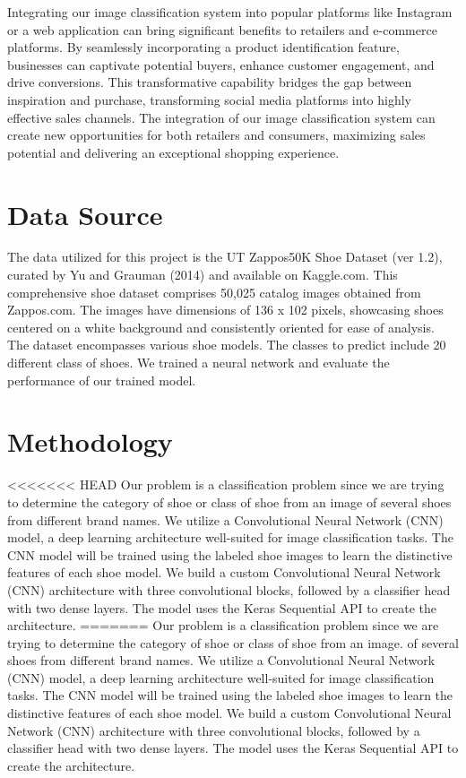 \documentclass[11pt,a4paper]{article}
\begin{document}
\noindent
Integrating our image classification system into popular platforms like Instagram or a web application can bring significant benefits to retailers and e-commerce platforms. By seamlessly incorporating a product identification feature, businesses can captivate potential buyers, enhance customer engagement, and drive conversions. This transformative capability bridges the gap between inspiration and purchase, transforming social media platforms into highly effective sales channels. The integration of our image classification system can create new opportunities for both retailers and consumers, maximizing sales potential and delivering an exceptional shopping experience. 
	
\section{Data Source} 
The data utilized for this project is the UT Zappos50K Shoe Dataset (ver 1.2), curated by Yu and Grauman (2014) and available on Kaggle.com. This comprehensive shoe dataset comprises 50,025 catalog images obtained from Zappos.com. The images have dimensions of 136 x 102 pixels, showcasing shoes centered on a white background and consistently oriented for ease of analysis. The dataset encompasses various shoe models. The classes to predict include 20 different class of shoes.  We trained a neural network and evaluate the performance of our trained model.  
		
\section{Methodology} 
<<<<<<< HEAD
Our problem is a classification problem since we are trying to determine the category of shoe or class of shoe from an image of several shoes from different brand names. We utilize a Convolutional Neural Network (CNN) model, a deep learning architecture well-suited for image classification tasks. The CNN model will be trained using the labeled shoe images to learn the distinctive features of each shoe model. We build a custom Convolutional Neural Network (CNN) architecture with three convolutional blocks, followed by a classifier head with two dense layers. The model uses the Keras Sequential API to create the architecture.
=======
Our problem is a classification problem since we are trying to determine the category of shoe or class of shoe from an image. of several shoes from different brand names. We utilize a Convolutional Neural Network (CNN) model, a deep learning architecture well-suited for image classification tasks. The CNN model will be trained using the labeled shoe images to learn the distinctive features of each shoe model. We build a custom Convolutional Neural Network (CNN) architecture with three convolutional blocks, followed by a classifier head with two dense layers. The model uses the Keras Sequential API to create the architecture.
\end{document}
